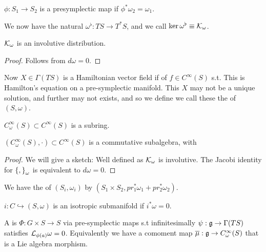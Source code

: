 \documentclass{article}
\begin{document}
\begin{definition}
$\phi: S_1 \to S_2$ is a presymplectic map if $\phi^\ast \omega_2 = \omega_1$. 
\end{definition}

We now have the natural $\omega^\flat : TS \to T^\ast S$, and we call $\ker\omega^\flat \equiv \mc{K}_\omega$. 

\begin{prop}
$\mc{K}_\omega$ is an involutive distribution.  
\end{prop}
\begin{proof}
Follows from $d\omega = 0$.
\end{proof}

Now $X \in \Gamma(TS)$ is a Hamiltonian vector field if of $ f \in C^\infty(S)$ s.t. 
This is Hamilton's equation on a pre-symplectic manifold. This $X$ may not be a unique solution, and further may not exists, and so we define 
we call these the  of $(S,\omega)$. 

\begin{ex}
$C^\infty_\omega(S) \subset C^\infty(S)$ is a subring. 
\end{ex}

\begin{prop}
$(C^\infty_\omega(S), \cdot)\subset C^\infty(S)$ is a commutative subalgebra, with 
\end{prop}
\begin{proof}
We will give a sketch: Well defined as $\mc{K}_\omega$ is involutive. The Jacobi identity for $\acomm[]{}_\omega $ is equivalent to $d\omega = 0$. 
\end{proof}

\begin{definition}
We have the  of $(S_i,\omega_i)$ by $(S_1 \times S_2, pr_1^\ast \omega_1 + pr_2^\ast \omega_2)$. 
\end{definition}

\begin{definition}
$i: C \hookrightarrow (S, \omega)$ is an isotropic submanifold if $i^\ast \omega = 0$. 
\end{definition}

\begin{definition}
A  is $\Phi : G \times S \to S$ via pre-symplectic maps s.t infinitesimally $\psi : \mf{g} \to \Gamma(TS)$  satisfies $\mc{L}_{\phi(a)} \omega = 0$. Equivalently we have a comoment map $\bar{\mu} : \mf{g} \to C^\infty_\omega(S)$ that is a Lie algebra morphism. 
\end{definition}
\end{document}
